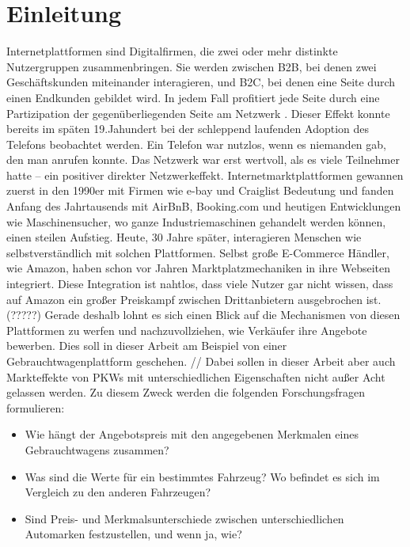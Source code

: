 \section{Einleitung}

Internetplattformen sind Digitalfirmen, die zwei oder mehr distinkte Nutzergruppen zusammenbringen. Sie werden zwischen B2B, bei denen zwei Geschäftskunden miteinander interagieren, und B2C, bei denen eine Seite durch einen Endkunden gebildet wird. In jedem Fall profitiert jede Seite durch eine Partizipation der gegenüberliegenden Seite am Netzwerk \cite{MUZELLEC2015139}. Dieser Effekt konnte bereits im späten 19.Jahundert bei der schleppend laufenden Adoption des Telefons beobachtet werden. Ein Telefon war nutzlos, wenn es niemanden gab, den man anrufen konnte. Das Netzwerk war erst wertvoll, als es viele Teilnehmer hatte – ein positiver direkter Netzwerkeffekt. \cite{evans2016matchmakers}
Internetmarktplattformen gewannen zuerst in den 1990er mit Firmen wie e-bay und Craiglist Bedeutung und fanden Anfang des Jahrtausends mit AirBnB, Booking.com und heutigen Entwicklungen wie Maschinensucher, wo ganze Industriemaschinen gehandelt werden können, einen steilen Aufstieg. Heute, 30 Jahre später, interagieren Menschen wie selbstverständlich mit solchen Plattformen. 
Selbst große E-Commerce Händler, wie Amazon, haben schon vor Jahren Marktplatzmechaniken in ihre Webseiten integriert. Diese Integration ist nahtlos, dass viele Nutzer gar nicht wissen, dass auf Amazon ein großer Preiskampf zwischen Drittanbietern ausgebrochen ist. (?????)
Gerade deshalb lohnt es sich einen Blick auf die Mechanismen von diesen Plattformen zu werfen und nachzuvollziehen, wie Verkäufer ihre Angebote bewerben.
Dies soll in dieser Arbeit am Beispiel von einer Gebrauchtwagenplattform geschehen. //
Dabei sollen in dieser Arbeit aber auch Markteffekte von PKWs mit unterschiedlichen Eigenschaften nicht außer Acht gelassen werden. Zu diesem Zweck werden die folgenden Forschungsfragen formulieren:

\begin{itemize}
    \item Wie hängt der Angebotspreis mit den angegebenen Merkmalen eines Gebrauchtwagens zusammen?
    \item Was sind die Werte für ein bestimmtes Fahrzeug? Wo befindet es sich im Vergleich zu den anderen Fahrzeugen? 
    \item Sind Preis- und Merkmalsunterschiede zwischen unterschiedlichen Automarken festzustellen, und wenn ja, wie?
\end{itemize}

